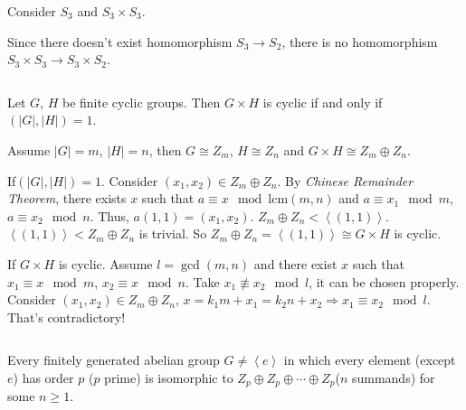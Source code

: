 \begin{answer}
    Consider $S_{3}$ and $S_{3}\times S_{3}$.

    \begin{figure}[H]\centering
    \end{figure}
    Since there doesn't exist homomorphism $S_{3}\to S_{2}$, there is no homomorphism $S_{3}\times S_{3}\to S_{3}\times S_{2}$.
\end{answer}

$$ $$

\begin{ex}
    Let $G$, $H$ be finite cyclic groups. Then $G\times H$ is cyclic if and only if $(\left| G \right|, \left| H \right|  )=1$.
\end{ex}

\begin{answer}
    Assume $\left| G \right| =m$, $\left| H \right| =n$, then $G\cong Z_{m}$, $H\cong Z_{n}$ and $G\times H\cong Z_{m}\oplus Z_{n}$.
    
    If$(\left| G \right| ,\left| H \right| )=1$. Consider $(x_{1}, x_{2})\in Z_{m}\oplus Z_{n}$. By \emph{Chinese Remainder Theorem}, there exists $x$ such that $a\equiv x\mod \mathrm{lcm}(m,n)$ and $a\equiv x_{1}\mod m$, $a\equiv x_{2}\mod n$. Thus, $a(1,1)=(x_{1},x_{2})$. $Z_{m}\oplus Z_{n}<\left\langle (1,1)\right\rangle$. $\left\langle (1,1)\right\rangle<Z_{m}\oplus Z_{n}$ is trivial. So $Z_{m}\oplus Z_{n}=\left\langle(1,1)\right\rangle\cong G\times H$ is cyclic.

    If $G\times H$ is cyclic. Assume $l=\gcd(m,n)$ and there exist $x$ such that  $x_{1}\equiv x\mod m$, $x_{2}\equiv x\mod n$. Take $x_{1}\not\equiv x_{2}\mod l$, it can be chosen properly. Consider $(x_{1}, x_{2})\in Z_{m}\oplus Z_{n}$, $x=k_{1}m+x_{1}=k_{2}n+x_{2}\Rightarrow x_{1}\equiv x_{2}\mod l$. That's contradictory!
\end{answer}

$$ $$

\begin{ex}
    Every finitely generated abelian group $G\neq\left\langle e\right\rangle$ in which every element (except $e$) has order $p$ ($p$ prime) is isomorphic to $Z_{p}\oplus Z_{p}\oplus\cdots\oplus Z_{p}$($n$ summands) for some $n\geq 1$.
\end{ex}

